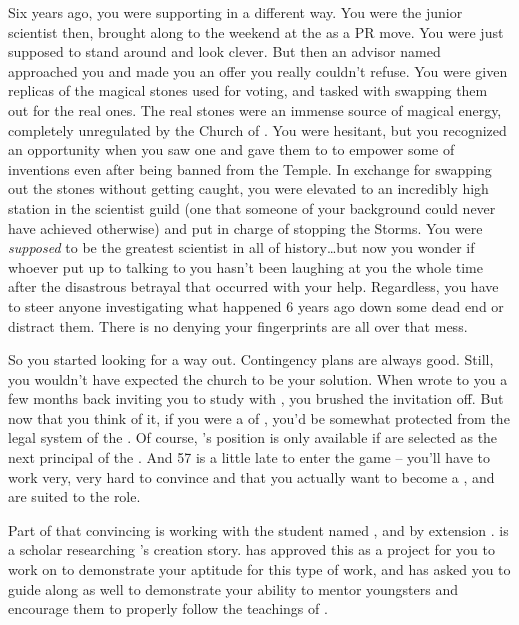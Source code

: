 \documentclass[char]{GL2020}
\begin{document}
Six years ago, you were supporting \cChupInventor{} in a different way. You were the junior scientist then, brought along to the weekend at the \pSchool{} as a PR move. You were just supposed to stand around and look clever. But then an advisor named \cEvil{} approached you and made you an offer you really couldn’t refuse. You were given replicas of the magical stones used for voting, and tasked with swapping them out for the real ones. The real stones were an immense source of magical energy, completely unregulated by the Church of \cTechGod{}. You were hesitant, but you recognized an opportunity when you saw one and gave them to \cChupInventor{} to empower some of \cChupInventor{\their} inventions even after being banned from the Temple. In exchange for swapping out the stones without getting caught, you were elevated to an incredibly high station in the scientist guild (one that someone of your background could never have achieved otherwise) and put in charge of stopping the Storms. You were \emph{supposed} to be the greatest scientist in all of history\ldots but now you wonder if whoever put \cEvil{} up to talking to you hasn’t been laughing at you the whole time after the disastrous betrayal that occurred with your help. Regardless, you have to steer anyone investigating what happened 6 years ago down some dead end or distract them. There is no denying your fingerprints are all over that mess.

So you started looking for a way out. Contingency plans are always good. Still, you wouldn’t have expected the church to be your solution. When \cBeetle{} wrote to you a few months back inviting you to study with \cBeetle{\them}, you brushed the invitation off. But now that you think of it, if you were a \cHeadScientist{\cleric} of \cTechGod{}, you’d be somewhat protected from the legal system of the \pTech{}. Of course, \cBeetle{}’s position is only available if \cBeetle{\they} are selected as the next principal of the \pSc{}. And 57 is a little late to enter the game -- you’ll have to work very, very hard to convince \cAntiChup{} and \cBeetle{} that you actually want to become a \cHeadScientist{\cleric}, and are suited to the role.

Part of that convincing is working with the student named \cScholarship{}, and by extension \cEbbPriest{}. \cEbbPriest{} is a scholar researching \pEarth{}’s creation story. \cBeetle{} has approved this as a project for you to work on to demonstrate your aptitude for this type of work, and has asked you to guide \cScholarship{} along as well to demonstrate your ability to mentor youngsters and encourage them to properly follow the teachings of \cTechGod{}.
\end{document}
